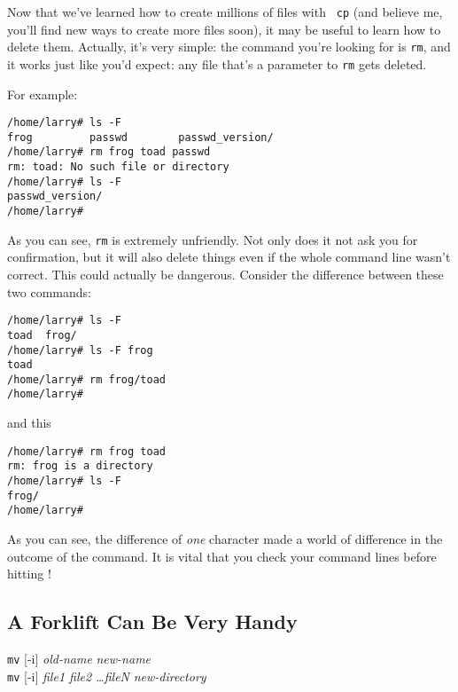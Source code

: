 Now that we've learned how to create millions of files with {\tt
cp} (and believe me, you'll find new ways to create more files
soon), it may be useful to learn how to delete them. Actually, it's very
simple: the command you're looking for is {\tt rm}, and it works just like
you'd expect: any file that's a parameter to {\tt rm} gets deleted.

For example:
\begin{screen}\begin{verbatim}
/home/larry# ls -F
frog         passwd        passwd_version/
/home/larry# rm frog toad passwd
rm: toad: No such file or directory
/home/larry# ls -F
passwd_version/
/home/larry#
\end{verbatim}\end{screen}

As you can see, {\tt rm} is extremely unfriendly.  Not only does it not ask
you for confirmation, but it will also delete things even if the whole
command line wasn't correct. This could actually be dangerous. Consider
the difference between these two commands:
\begin{screen}\begin{verbatim}
/home/larry# ls -F
toad  frog/
/home/larry# ls -F frog
toad
/home/larry# rm frog/toad
/home/larry#
\end{verbatim}\end{screen}
and this
\begin{screen}\begin{verbatim}
/home/larry# rm frog toad
rm: frog is a directory
/home/larry# ls -F
frog/
/home/larry#
\end{verbatim}\end{screen}

\cautionpar As you can see, the difference of {\em one\/} character made
a world of difference in the outcome of the command. It is vital that you
check your command lines before hitting \ret!


\subsection{A Forklift Can Be Very Handy}

\begin{command}
{\tt mv} [-i] {\sl old-name} {\sl new-name}\\
{\tt mv} [-i] {\sl file1 file2 \ldots fileN} {\sl new-directory}
\end{command}

